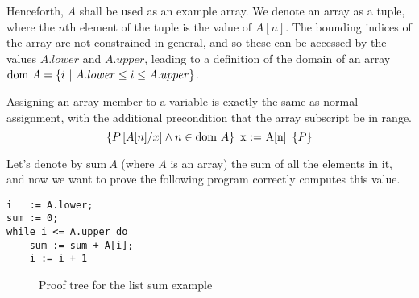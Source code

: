 Henceforth, $A$ shall be used as an example array. We denote an array
as a tuple, where the $n$th element of the tuple is the value of
$A[n]$. The bounding indices of the array are not constrained in
general, and so these can be accessed by the values $A.lower$ and
$A.upper$, leading to a definition of the domain of an array $\dom~A =
\{i~|~A.lower \leq i \leq A.upper\}$.

\begin{definition}
  Assigning an array member to a variable is exactly the same as
  normal assignment, with the additional precondition that the array
  subscript be in range.
  \[\htriple{P\left[A[n]/x\right] \land n \in \dom~A}{x := A[n]}{P}\]
\end{definition}

\begin{example}
  \label{exmpl:heap-sum}
  
  Let's denote by $\mathrm{sum}~A$ (where $A$ is an array) the sum of
  all the elements in it, and now we want to prove the following
  program correctly computes this value.

\begin{lstlisting}
i   := A.lower;
sum := 0;
while i <= A.upper do
    sum := sum + A[i];
    i := i + 1
\end{lstlisting}

  \begin{figure}[t]
    \centering
      \begin{prooftree}




      \end{prooftree}
    \caption{Proof tree for the list sum example}
    \label{fig:exmpl:heap-sum-tree}
  \end{figure}


\end{example}
